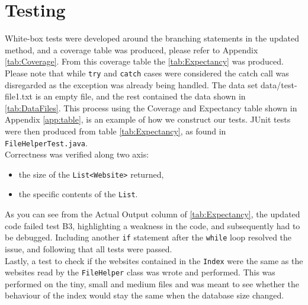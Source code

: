 \section{Testing}
White-box tests were developed around the branching statements in the updated method, and a coverage table was produced, please refer to Appendix \ref{tab:Coverage}. From this coverage table the \ref{tab:Expectancy} was produced. Please note that while {\tt try} and {\tt catch} cases were considered the catch call was disregarded as the exception was already being handled. The data set data/test-file1.txt is an empty file, and the rest contained the data shown in \ref{tab:DataFiles}. This process using the Coverage and Expectancy table shown in Appendix \ref{app:table}, is an example of how we construct our tests.
JUnit tests were then produced from table \ref{tab:Expectancy}, as found in {\tt FileHelperTest.java}.\\ Correctness was verified along two axis:
\begin{itemize}
    \item the size of the {\tt List<Website>} returned,
    \item the specific contents of the {\tt List}.
\end{itemize}
As you can see from the Actual Output column of \ref{tab:Expectancy}, the updated code failed test B3, highlighting a weakness in the code, and subsequently had to be debugged. Including another {\tt if} statement after the {\tt while} loop resolved the issue, and following that all tests were passed.\\
Lastly, a test to check if the websites contained in the {\tt Index} were the same as the websites read by the {\tt FileHelper} class was wrote and performed. This was performed on the tiny, small and medium files and was meant to see whether the behaviour of the index would stay the same when the database size changed.